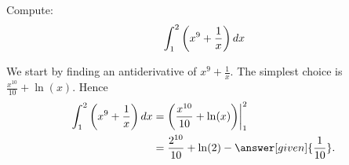 \documentclass{ximera}
\begin{document}
\begin{example}
Compute:
\[
\int_1^2\left(x^9 + \frac{1}{x}\right) \mathop{}\!d x
\]
\begin{explanation}
We start by finding an antiderivative of $x^9 + \frac{1}{x}$. The simplest choice is $\frac{x^{10}}{10} + \ln(x)$. Hence
\begin{align*}
\int_1^2\left(x^9 + \frac{1}{x}\right) \d x &= \left(\frac{x^{10}}{10} + \ln(x)\right)\biggr\vert_1^2 \\
&= \frac{2^{10}}{10} + \ln(2) - \answer[given]{\frac{1}{10}}.
\end{align*}
\end{explanation}
\end{example}




%
%
%
\end{document}
